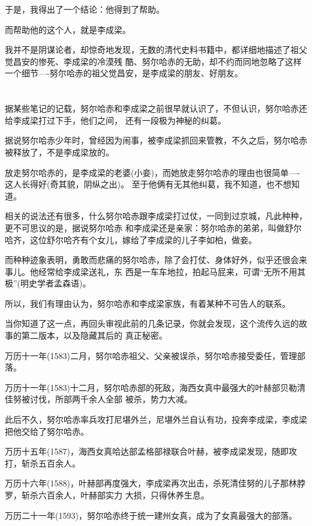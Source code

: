 \documentclass[11pt,a4paper,onecolumn]{article}
\begin{document}
于是，我得出了一个结论：他得到了帮助。

而帮助他的这个人，就是李成梁。

我并不是阴谋论者，却惊奇地发现，无数的清代史料书籍中，都详细地描述了祖父觉昌安的惨死、李成梁的冷漠残
酷、努尔哈赤的无助，却不约而同地忽略了这样一个细节----努尔哈赤的祖父觉昌安，是李成梁的朋友、好朋友。

\section[\thesection]{}

据某些笔记的记载，努尔哈赤和李成梁之前很早就认识了，不但认识，努尔哈赤还给李成梁打过下手，他们之间，
还有一段极为神秘的纠葛。

据说努尔哈赤少年时，曾经因为闹事，被李成梁抓回来管教，不久之后，努尔哈赤被释放了，不是李成梁放的。

放走努尔哈赤的，是李成梁的老婆(小妾)，而她放走努尔哈赤的理由也很简单----这人长得好(奇其貌，阴纵之出)。
至于他俩有无其他纠葛，我不知道，也不想知道。

相关的说法还有很多，什么努尔哈赤跟李成梁打过仗，一同到过京城，凡此种种，更不可思议的是，据说努尔哈赤
和李成梁还是亲家：努尔哈赤的弟弟，叫做舒尔哈齐，这位舒尔哈齐有个女儿，嫁给了李成梁的儿子李如柏，做妾。

而种种迹象表明，勇敢而悲痛的努尔哈赤，除了会打仗、身体好外，似乎还很会来事儿。他经常给李成梁送礼，东
西是一车车地拉，拍起马屁来，可谓``无所不用其极''(明史学者孟森语)。

所以，我们有理由认为，努尔哈赤和李成梁家族，有着某种不可告人的联系。

当你知道了这一点，再回头审视此前的几条记录，你就会发现，这个流传久远的故事的第二版本，以及隐藏其后的
真正秘密。

万历十一年(1583)二月，努尔哈赤祖父、父亲被误杀，努尔哈赤接受委任，管理部落。

万历十一年(1583)十二月，努尔哈赤部的死敌，海西女真中最强大的叶赫部贝勒清佳努被讨伐，所部两千余人全部
被杀，势力大减。

此后不久，努尔哈赤率兵攻打尼堪外兰，尼堪外兰自认有功，投奔李成梁，李成梁把他交给了努尔哈赤。

万历十五年(1587)，海西女真哈达部孟格部禄联合叶赫，被李成梁发现，随即攻打，斩杀五百余人。

万历十六年(1588)，叶赫部再度强大，李成梁再次出击，杀死清佳努的儿子那林脖罗，斩杀六百余人，叶赫部实力
大损，只得休养生息。

万历二十一年(1593)，努尔哈赤终于统一建州女真，成为了女真最强大的部落。
\end{document}
